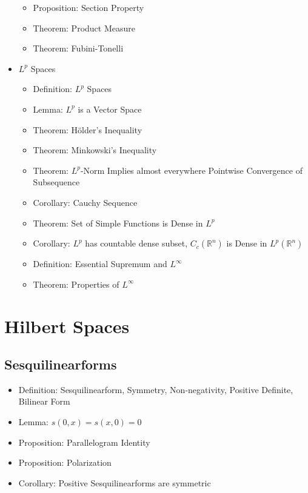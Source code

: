 \documentclass[8pt,twocolumn]{article}
\begin{document}
\begin{itemize}
\begin{itemize}
            \item Proposition: Section Property
            \item Theorem: Product Measure
            \item Theorem: Fubini-Tonelli
          \end{itemize}
        \item $L^p$ Spaces
          \begin{itemize}
            \item Definition: $L^p$ Spaces
            \item Lemma: $L^p$ is a Vector Space
            \item Theorem: Hölder's Inequality
            \item Theorem: Minkowski's Inequality
            \item Theorem: $L^p$-Norm Implies almost everywhere Pointwise Convergence of Subsequence
            \item Corollary: Cauchy Sequence
            \item Theorem: Set of Simple Functions is Dense in $L^p$
            \item Corollary: $L^p$ has countable dense subset, $C_c(\mathds{R}^n)$ is Dense in $L^p(\mathds{R}^n)$
            \item Definition: Essential Supremum and $L^\infty$
            \item Theorem: Properties of $L^\infty$
          \end{itemize}
      \end{itemize}

  \section{Hilbert Spaces} %
  \label{sec:hilbert_spaces}
    \subsection{Sesquilinearforms} %
    \label{sub:sesquilinearforms}
      \begin{itemize}
        \item Definition: Sesquilinearform, Symmetry, Non-negativity, Positive Definite, Bilinear Form
        \item Lemma: $s(0,x) = s(x,0) = 0$
        \item Proposition: Parallelogram Identity
        \item Proposition: Polarization
        \item Corollary: Positive Sesquilinearforms are symmetric
      \end{itemize}
\end{document}
